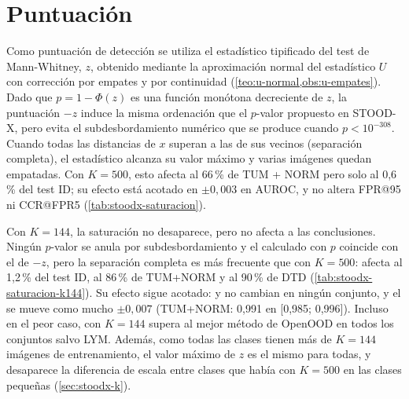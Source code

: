 
\section{Puntuación}\label{sec:stoodx-puntuacion}

Como puntuación de detección se utiliza el estadístico tipificado del test de Mann-Whitney, $z$, obtenido mediante la aproximación normal del estadístico $U$ con corrección por empates y por continuidad (\cref{teo:u-normal,obs:u-empates}). Dado que $p = 1 - \Phi(z)$ es una función monótona decreciente de $z$, la puntuación $-z$ induce la misma ordenación que el $p$-valor propuesto en STOOD-X, pero evita el subdesbordamiento numérico que se produce cuando $p < 10^{-308}$. Cuando todas las distancias de $x$ superan a las de sus vecinos (separación completa), el estadístico alcanza su valor máximo y varias imágenes quedan empatadas. Con $K = 500$, esto afecta al 66\,\% de TUM + NORM pero solo al 0,6\,\% del test ID; su efecto está acotado en $\pm 0{,}003$ en AUROC, y no altera FPR@95 ni CCR@FPR5 (\cref{tab:stoodx-saturacion}).



Con $K = 144$, la saturación no desaparece, pero no afecta a las conclusiones. Ningún $p$-valor se anula por subdesbordamiento y el \AUROC calculado con $p$ coincide con el de $-z$, pero la separación completa es más frecuente que con $K = 500$: afecta al 1,2\,\% del test ID, al 86\,\% de TUM+NORM y al 90\,\% de DTD (\cref{tab:stoodx-saturacion-k144}). Su efecto sigue acotado:  y  no cambian en ningún conjunto, y el \AUROC se mueve como mucho $\pm 0{,}007$ (TUM+NORM: 0,991 en [0,985; 0,996]). Incluso en el peor caso, \stoodx con $K = 144$ supera al mejor método de OpenOOD en todos los conjuntos salvo LYM. Además, como todas las clases tienen más de $K = 144$ imágenes de entrenamiento, el valor máximo de $z$ es el mismo para todas, y desaparece la diferencia de escala entre clases que había con $K = 500$ en las clases pequeñas (\cref{sec:stoodx-k}).




